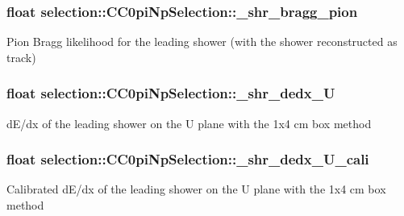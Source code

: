 \subsubsection[{\texorpdfstring{\+\_\+shr\+\_\+bragg\+\_\+pion}{_shr_bragg_pion}}]{\setlength{\rightskip}{0pt plus 5cm}float selection\+::\+C\+C0pi\+Np\+Selection\+::\+\_\+shr\+\_\+bragg\+\_\+pion\hspace{0.3cm}{\ttfamily [private]}}\hypertarget{classselection_1_1CC0piNpSelection_afa97d9a456bf2255e06c6c5226f25929}{}\label{classselection_1_1CC0piNpSelection_afa97d9a456bf2255e06c6c5226f25929}
Pion Bragg likelihood for the leading shower (with the shower reconstructed as track) 
\subsubsection[{\texorpdfstring{\+\_\+shr\+\_\+dedx\+\_\+U}{_shr_dedx_U}}]{\setlength{\rightskip}{0pt plus 5cm}float selection\+::\+C\+C0pi\+Np\+Selection\+::\+\_\+shr\+\_\+dedx\+\_\+U\hspace{0.3cm}{\ttfamily [private]}}\hypertarget{classselection_1_1CC0piNpSelection_ada2f72c2f814e7d06c24a50ff5ad4fcc}{}\label{classselection_1_1CC0piNpSelection_ada2f72c2f814e7d06c24a50ff5ad4fcc}
d\+E/dx of the leading shower on the U plane with the 1x4 cm box method 
\subsubsection[{\texorpdfstring{\+\_\+shr\+\_\+dedx\+\_\+\+U\+\_\+cali}{_shr_dedx_U_cali}}]{\setlength{\rightskip}{0pt plus 5cm}float selection\+::\+C\+C0pi\+Np\+Selection\+::\+\_\+shr\+\_\+dedx\+\_\+\+U\+\_\+cali\hspace{0.3cm}{\ttfamily [private]}}\hypertarget{classselection_1_1CC0piNpSelection_a7c90820db5398c179aef3186ab11e521}{}\label{classselection_1_1CC0piNpSelection_a7c90820db5398c179aef3186ab11e521}
Calibrated d\+E/dx of the leading shower on the U plane with the 1x4 cm box method 
